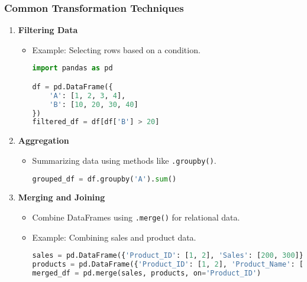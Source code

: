 \documentclass[aspectratio=169]{beamer}
\begin{document}
\begin{frame}[fragile]
    \frametitle{Common Transformation Techniques}
    \begin{enumerate}
        \item \textbf{Filtering Data}
        \begin{itemize}
            \item Example: Selecting rows based on a condition.
            \begin{lstlisting}[language=Python]
import pandas as pd

df = pd.DataFrame({
    'A': [1, 2, 3, 4],
    'B': [10, 20, 30, 40]
})
filtered_df = df[df['B'] > 20]
            \end{lstlisting}
        \end{itemize}
        
        \item \textbf{Aggregation}
        \begin{itemize}
            \item Summarizing data using methods like \texttt{.groupby()}.
            \begin{lstlisting}[language=Python]
grouped_df = df.groupby('A').sum()
            \end{lstlisting}
        \end{itemize}

        \item \textbf{Merging and Joining}
        \begin{itemize}
            \item Combine DataFrames using \texttt{.merge()} for relational data.
            \item Example: Combining sales and product data.
            \begin{lstlisting}[language=Python]
sales = pd.DataFrame({'Product_ID': [1, 2], 'Sales': [200, 300]})
products = pd.DataFrame({'Product_ID': [1, 2], 'Product_Name': ['A', 'B']})
merged_df = pd.merge(sales, products, on='Product_ID')
            \end{lstlisting}
        \end{itemize}
    \end{enumerate}
\end{frame}
\end{document}
